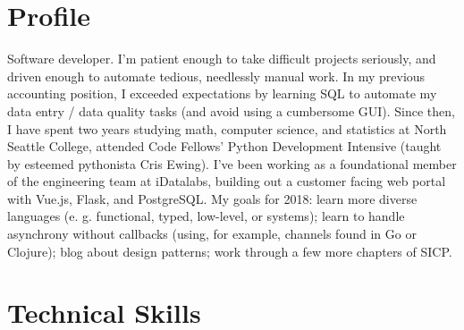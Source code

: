 \documentclass[10pt,a4paper,sans]{moderncv}        %
\begin{document}
\makecvtitle

\section{Profile}
Software developer. I'm patient enough to take difficult projects seriously, and
driven enough to automate tedious, needlessly manual work. In my previous
accounting position, I exceeded expectations by learning SQL to automate my data
entry / data quality tasks (and avoid using a cumbersome GUI). Since then, I
have spent two years studying math, computer science, and statistics at North
Seattle College, attended Code Fellows' Python Development Intensive (taught by
esteemed pythonista Cris Ewing). I've been working as a foundational member of
the engineering team at iDatalabs, building out a customer facing web portal
with Vue.js, Flask, and PostgreSQL. My goals for 2018: learn more diverse
languages (e. g. functional, typed, low-level, or systems); learn to handle
asynchrony without callbacks (using, for example, channels found in Go or
Clojure); blog about design patterns; work through a few more chapters of SICP.

\section{Technical Skills}
\begin{cvcolumns}
\end{cvcolumns}

\begin{comment}
  \section{Technical Skills}
  \subsection{Proficient}
  Python, Django, Django REST Framework, Pyramid, Git, SQL, HTML/CSS,
  JavaScript/jQuery, Unix systems, Shell Scripting, Org-mode, Regular
  Expressions
  \subsection{Familiar}
  AWS Deployment, Heroku Deployment, Ansible, PostgreSQL, Nginx, Gunicorn,
  Scheme, Sed
\end{comment}
\end{document}
